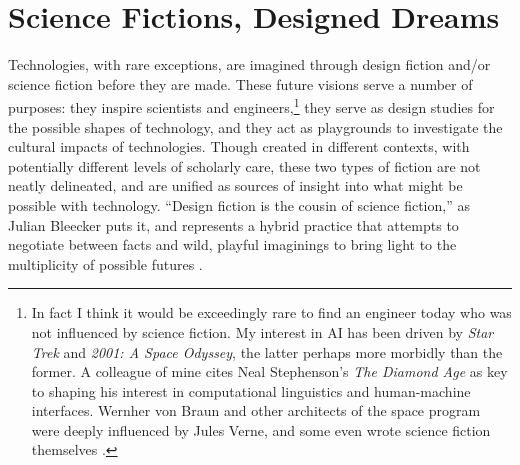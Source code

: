 \chapter{Science Fictions, Designed Dreams}
\label{chap:2}













Technologies, with rare exceptions, are imagined through design
fiction and/or science fiction before they are made. These future
visions serve a number of purposes:  they inspire scientists and
engineers,\footnote{In fact I think it would be exceedingly rare to
  find an engineer today who was not influenced by science fiction. My
  interest in AI has been driven by \emph{Star Trek} and \emph{2001: A
  Space Odyssey}, the latter perhaps more morbidly than the former. A
  colleague of mine cites Neal Stephenson's
  \emph{The Diamond Age} as key to shaping his interest in
  computational linguistics and human-machine interfaces. Wernher von
  Braun and other architects of the space program were deeply
  influenced by Jules Verne, and some even wrote science fiction
  themselves \cite[p. 2]{marketingMoon}.} they serve as design
studies for the possible shapes of technology, and they act as
playgrounds to investigate the cultural impacts of technologies.
Though created in different contexts, with potentially 
different levels of scholarly care, these two types of fiction are not
neatly delineated, and are unified as sources of insight into what
might be possible with technology. ``Design fiction is the cousin of
science fiction,'' as Julian Bleecker puts it, and represents a hybrid
practice that attempts to negotiate between facts and wild, playful
imaginings to bring light to the multiplicity of possible
futures \cite[p. 8]{bleecker}. 

